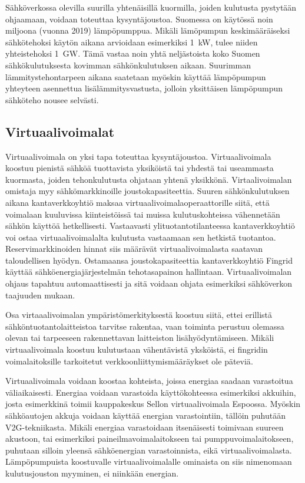   Sähköverkossa olevilla suurilla yhtenäisillä kuormilla, joiden kulutusta pystytään ohjaamaan, voidaan toteuttaa kysyntäjoustoa\parencite{fingrid}. Suomessa on käytössä noin miljoona (vuonna 2019) lämpöpumppua\parencite{sulpu}. Mikäli lämöpumpun keskimääräiseksi sähkötehoksi käytön aikana arvioidaan esimerkiksi \SI{1}{\kilo\watt}, tulee niiden yhteistehoksi \SI{1}{\giga\watt}. Tämä vastaa noin yhtä neljästoista koko Suomen sähkökulutuksesta kovimman sähkönkulutuksen aikaan. Suurimman lämmitystehontarpeen aikana saatetaan myöskin käyttää lämpöpumpun yhteyteen asennettua lisälämmitysvastusta, jolloin yksittäisen lämpöpumpun sähköteho nousee selvästi.

\subsection{Virtuaalivoimalat}

  Virtuaalivoimala on yksi tapa toteuttaa kysyntäjoustoa. Virtuaalivoimala koostuu pienistä sähköä tuottavista yksiköistä tai yhdestä tai useammasta kuormasta, joiden tehonkulutusta ohjataan yhtenä yksikkönä. Virtaalivoimalan omistaja myy sähkömarkkinoille joustokapasiteettia. Suuren sähkönkulutuksen aikana kantaverkkoyhtiö maksaa virtuaalivoimalaoperaattorille siitä, että voimalaan kuuluvissa kiinteistöissä tai muissa kulutuskohteissa vähennetään sähkön käyttöä hetkellisesti. Vastaavasti ylituotantotilanteessa kantaverkkoyhtiö voi ostaa virtuaalivoimalalta kulutusta vastaamaan sen hetkistä tuotantoa. Reservimarkkinoiden hinnat siis määrävät virtuaalivoimalasta saatavan taloudellisen hyödyn. Ostamaansa joustokapasiteettia kantaverkkoyhtiö Fingrid käyttää sähköenergiajärjestelmän tehotasapainon hallintaan. Virtuaalivoimalan ohjaus tapahtuu automaattisesti ja sitä voidaan ohjata esimerkiksi sähköverkon taajuuden mukaan.\parencite{fingrid}

  Osa virtaaalivoimalan ympäristömerkityksestä koostuu siitä, ettei erillistä sähköntuotantolaitteistoa tarvitse rakentaa, vaan toiminta perustuu olemassa olevan tai tarpeeseen rakennettavan laitteiston lisähyödyntämiseen. Mikäli virtuaalivoimala koostuu kulutustaan vähentävistä yksköistä, ei fingridin voimalaitoksille tarkoitetut verkkoonliittymismääräykset ole päteviä\parencite{VJV2018}.

  Virtuaalivoimala voidaan koostaa kohteista, joissa energiaa saadaan varastoitua väliaikaisesti. Energiaa voidaan varastoida käyttökohteessa esimerkiksi akkuihin, josta esimerkkinä toimii kauppakeskus Sellon virtuaalivoimala Espoossa\parencite{sello}. Myöskin sähköautojen akkuja voidaan käyttää energian varastointiin, tällöin puhutään \gls{V2G}-tekniikasta\parencite{dictOfEnergy}. Mikäli energiaa varastoidaan itsenäisesti toimivaan suureen akustoon, tai esimerkiksi paineilmavoimalaitokseen tai pumppuvoimalaitokseen, puhutaan silloin yleensä sähköenergian varastoinnista, eikä virtuaalivoimalasta\parencite{dictOfEnergy}. Lämpöpumpuista koostuvalle virtuaalivoimalalle ominaista on siis nimenomaan kulutusjouston myyminen, ei niinkään energian.

